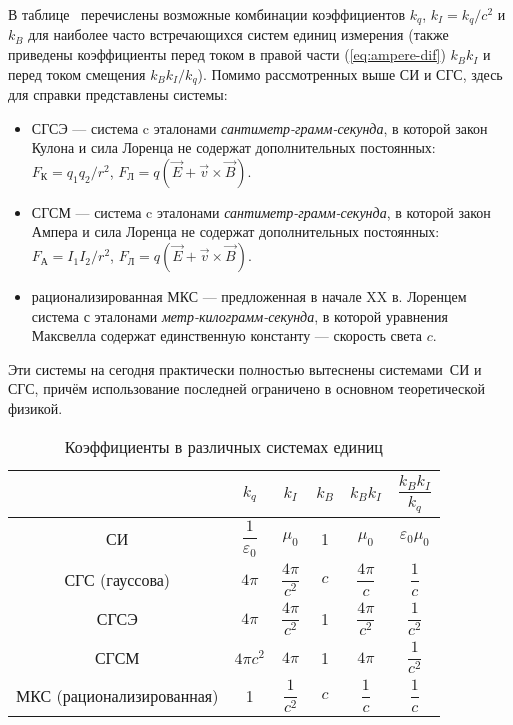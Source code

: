 В таблице~ перечислены возможные комбинации коэффициентов $k_{q}$, $k_{I}=k_{q}/c^{2}$
и $k_{B}$ для наиболее часто встречающихся систем единиц измерения
(также приведены коэффициенты перед током в правой части (\ref{eq:ampere-dif})
$k_{B}k_{I}$ и перед током смещения $k_{B}k_{I}/k_{q}$).
Помимо рассмотренных выше СИ и СГС, здесь для справки представлены системы:
\begin{itemize}
\item СГСЭ --- система c эталонами \emph{сантиметр-грамм-секунда},
    в которой закон Кулона и сила Лоренца не содержат дополнительных постоянных:
    $F_К = q_1q_2/r^2$, $F_Л = q(\vec{E} + \vec{v}\times \vec{B})$.
\item СГСМ --- система c эталонами \emph{сантиметр-грамм-секунда},
в которой закон Ампера и сила Лоренца не содержат дополнительных постоянных:
$F_А = I_1I_2/r^2$, $F_Л = q(\vec{E} + \vec{v}\times \vec{B})$.
\item рационализированная МКС --- предложенная в начале XX в. Лоренцем система
с эталонами \emph{метр-килограмм-секунда}, в которой уравнения
Максвелла содержат единственную константу --- скорость света $c$.
\end{itemize}
Эти системы на сегодня практически полностью вытеснены системами~СИ и
СГС, причём использование последней ограничено в основном
теоретической физикой.

\begin{table}[h!]
    \caption{Коэффициенты в различных системах единиц}
    \small
    \renewcommand{\arraystretch}{2}
    \centering
    \begin{tabular}{cccccc}
        \toprule
        & $k_{q}$ & $k_{I}$ & $k_{B}$ & $k_{B}k_{I}$
        & $\dfrac{k_{B}k_{I}}{k_{q}}$\\
        \midrule
        СИ & $\dfrac{1}{\varepsilon_{0}}$ & $\mu_{0}$ & 1 & $\mu_{0}$
        & $\varepsilon_{0}\mu_{0}$\\[1ex] \hline
        СГС (гауссова) & $4\pi$ & $\dfrac{4\pi}{c^{2}}$ & $c$ & $\dfrac{4\pi}{c}$ & $\dfrac{1}{c}$ \\[1ex] \hline
        СГСЭ & $4\pi$ & $\dfrac{4\pi}{c^{2}}$ & 1 & $\dfrac{4\pi}{c^{2}}$
        & $\dfrac{1}{c^{2}}$ \\[1ex] \hline
        СГСМ & $4\pi c^{2}$ & $4\pi$ & 1 & $4\pi$ & $\dfrac{1}{c^{2}}$ \\[1ex] \hline
        МКС (рационализированная) & 1 & $\dfrac{1}{c^{2}}$ & $c$ & $\dfrac{1}{c}$ & $\dfrac{1}{c}$\\
        \bottomrule
    \end{tabular}
\end{table}

